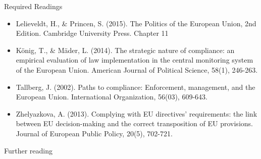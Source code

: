 \noindent Required Readings

\begin{itemize}
	\item Lelieveldt, H., \& Princen, S. (2015). The Politics of the European Union, 2nd Edition. Cambridge University Press. Chapter 11
	\item K{\"o}nig, T., \& M{\"a}der, L. (2014). The strategic nature of compliance: an empirical evaluation of law implementation in the central monitoring system of the European Union. American Journal of Political Science, 58(1), 246-263.
	\item Tallberg, J. (2002). Paths to compliance: Enforcement, management, and the European Union. International Organization, 56(03), 609-643.
	\item Zhelyazkova, A. (2013). Complying with EU directives' requirements: the link between EU decision-making and the correct transposition of EU provisions. Journal of European Public Policy, 20(5), 702-721.
\end{itemize}

\noindent Further reading

